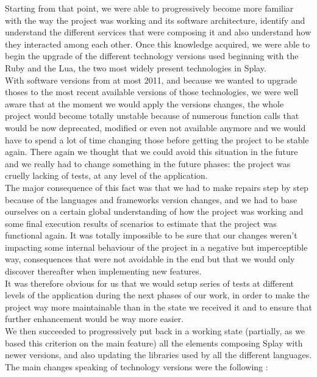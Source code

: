 \documentclass{eplmastersthesis}
\begin{document}
      Starting from that point, we were able to progressively become more
      familiar with the way the project was working and its software
      architecture, identify and understand the different services that
      were composing it and also understand how they interacted among
      each other. Once this knowledge acquired, we were able to begin the
      upgrade of the different technology versions used beginning with the
      Ruby and the Lua, the two most widely present technologies in Splay.\\
      With software versions from at most 2011, and because we wanted
      to upgrade thoses to the most recent available versions of those
      technologies, we were well aware that at the moment we would apply the
      versions changes, the whole project would become totally unstable
      because of numerous function calls that would be now deprecated,
      modified or even not available anymore and we would have to spend a lot
      of time changing those before getting the project to be stable again.
      There again we thought that we could avoid this situation in the future
      and we really had to change something in the future phases: the project
      was cruelly lacking of tests, at any level of the application.\\


      The major consequence of this fact was that we had to make repairs
      step by step because of the languages and frameworks version changes,
      and we had to base ourselves on a certain global understanding of how
      the project was working and some final execution results of scenarios
      to estimate that the project was functional again. It was totally
      impossible to be sure that our changes weren't impacting some internal
      behaviour of the project in a negative but imperceptible way,
      consequences that were not avoidable in the end but that we would
      only discover thereafter when implementing new features.\\
      It was therefore obvious for us that we would setup series of tests
      at different levels of the application during the next phases of our
      work, in order to make the project way more maintainable than in the
      state we received it and to ensure that further enhancement would
      be way more easier.\\


      We then succeeded to progressively put back in a working state
      (partially, as we based this criterion on the main feature) all the
      elements composing Splay with newer versions, and also updating the
      libraries used by all the different languages. The main changes
      speaking of technology versions were the following :
\end{document}
